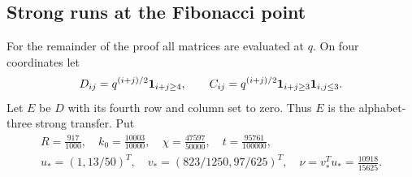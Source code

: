 \documentclass[11pt]{amsart}
\theoremstyle{definition}
\theoremstyle{remark}
\numberwithin{equation}{section}
\begin{document}
\subsection{Strong runs at the Fibonacci point}

For the remainder of the proof all matrices are evaluated at $q$.
On four coordinates let
\[
 D_{ij}=q^{(i+j)/2}{\bf1}_{i+j\ge4},\qquad
 C_{ij}=q^{(i+j)/2}{\bf1}_{i+j\ge3}{\bf1}_{i,j\le3}.
\]
Let $E$ be $D$ with its fourth row and column set to zero.  Thus $E$
is the alphabet-three strong transfer.  Put
\begin{gather}\label{raw:constants}
 R=\frac{917}{1000},\quad k_0=\frac{10003}{10000},\quad
 \chi=\frac{47597}{50000},\quad t=\frac{95761}{100000},\nonumber\\
 u_*=(1,13/50)^T,\quad v_*=(823/1250,97/625)^T,\quad
 \nu=v_*^Tu_*=\frac{10918}{15625}.
\end{gather}
\end{document}

